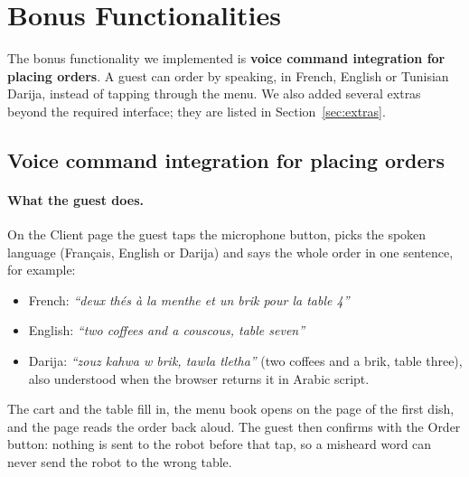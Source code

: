 \documentclass[11pt,a4paper]{article}
\begin{document}
\section{Bonus Functionalities}
\label{sec:bonus}

The bonus functionality we implemented is \textbf{voice command integration
for placing orders}. A guest can order by speaking, in French, English or
Tunisian Darija, instead of tapping through the menu. We also added several
extras beyond the required interface; they are listed in
Section~\ref{sec:extras}.

\subsection{Voice command integration for placing orders}

\paragraph{What the guest does.} On the Client page the guest taps the
microphone button, picks the spoken language (Français, English or Darija)
and says the whole order in one sentence, for example:
\begin{itemize}
  \item French: \emph{``deux thés à la menthe et un brik pour la table 4''}
  \item English: \emph{``two coffees and a couscous, table seven''}
  \item Darija: \emph{``zouz kahwa w brik, tawla tletha''} (two coffees and a brik, table three), also understood when the browser returns it in Arabic script.
\end{itemize}
The cart and the table fill in, the menu book opens on the page of the
first dish, and the page reads the order back aloud. The guest then
confirms with the Order button: nothing is sent to the robot before that
tap, so a misheard word can never send the robot to the wrong table.
\end{document}
